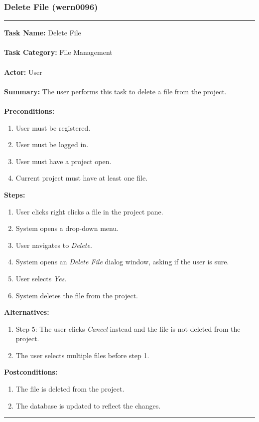 \documentclass[11pt]{report}
\begin{document}
\newpage

\subsubsection{Delete File (wern0096)}
\vspace{2pt}
\hrule
\vspace{8pt}
	\noindent\textbf{Task Name:} Delete File \\ \\
	\textbf{Task Category:} File Management \\ \\
	\textbf{Actor:} User \\ \\
	\textbf{Summary:} The user performs this task to delete a file from the project. \\ \\
	\textbf{Preconditions:} 
	\begin{enumerate}
		\item User must be registered.
		\item User must be logged in.
		\item User must have a project open.
		\item Current project must have at least one file.
	\end{enumerate}
	\textbf{Steps:}
	\begin{enumerate}
		\item User clicks right clicks a file in the project pane.
		\item System opens a drop-down menu.
		\item User navigates to \textit{Delete}.
		\item System opens an \textit{Delete File} dialog window, asking if the user is sure.
		\item User selects \textit{Yes}.
		\item System deletes the file from the project.
	\end{enumerate}
	\textbf{Alternatives:} 
	\begin{enumerate}
		\item Step 5: The user clicks \textit{Cancel} instead and the file is not deleted from the project.
		\item The user selects multiple files before step 1.
	\end{enumerate}
	\textbf{Postconditions:}
	\begin{enumerate}
		\item The file is deleted from the project.
		\item The database is updated to reflect the changes.
	\end{enumerate}
\hrule
\vspace{8pt} 
\end{document}
